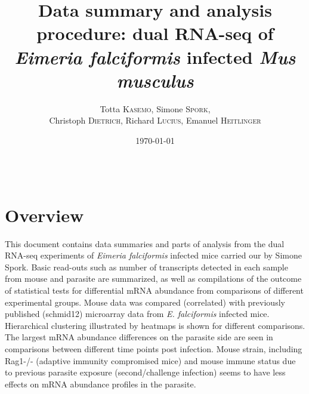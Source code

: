 \documentclass{article}
\title{Data summary and analysis procedure: dual RNA-seq of \textit{Eimeria falciformis} infected \textit{Mus musculus}} %
\author{Totta \textsc{Kasemo}, Simone \textsc{Spork},\\ Christoph \textsc{Dietrich}, Richard \textsc{Lucius}, Emanuel \textsc{Heitlinger}} %
\date{\today} %
\begin{document}
\maketitle %

\begin{center}
\begin{tabular}{l r}
\end{tabular}
\end{center}



\section{Overview}
This document contains data summaries and parts of analysis from the dual RNA-seq experiments of 
 \textit{Eimeria falciformis} infected mice carried our by Simone Spork. Basic read-outs
 such as number of transcripts detected in each sample from mouse and parasite are summarized, as
 well as compilations of the outcome of statistical tests for differential mRNA abundance from
 comparisons of different experimental groups. Mouse data was compared (correlated) with previously
 published (schmid12) microarray data from \textit{E. falciformis} infected mice.
 Hierarchical clustering illustrated by heatmaps is shown for different comparisons.\\
 The largest mRNA abundance differences on the parasite side are seen in comparisons between different
 time points post infection. Mouse strain, including Rag1-/- (adaptive immunity compromised mice) and 
 mouse immune status due to previous parasite exposure (second/challenge infection) seems to have less effects
 on mRNA abundance profiles in the parasite.
\end{document}
